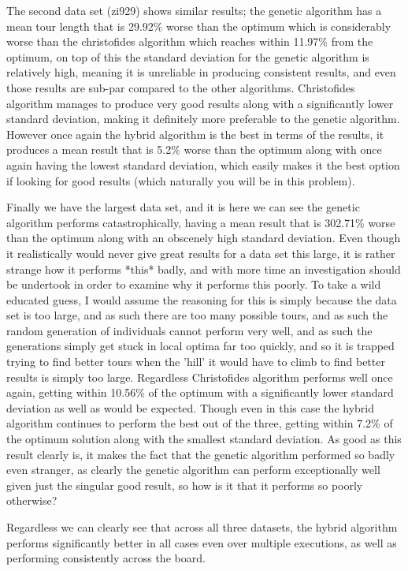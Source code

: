 \documentclass[11pt,a4paper,titlepage]{article}
\begin{document}
The second data set (zi929) shows similar results; the genetic algorithm has a mean tour length that is 29.92\% worse than the optimum which is considerably worse than the christofides algorithm which reaches within 11.97\% from the optimum, on top of this the standard deviation for the genetic algorithm is relatively high, meaning it is unreliable in producing consistent results, and even those results are sub-par compared to the other algorithms. Christofides algorithm manages to produce very good results along with a significantly lower standard deviation, making it definitely more preferable to the genetic algorithm. However once again the hybrid algorithm is the best in terms of the results, it produces a mean result that is 5.2\% worse than the optimum along with once again having the lowest standard deviation, which easily makes it the best option if looking for good results (which naturally you will be in this problem).

Finally we have the largest data set, and it is here we can see the genetic algorithm performs catastrophically, having a mean result that is 302.71\% worse than the optimum along with an obscenely high standard deviation. Even though it realistically would never give great results for a data set this large, it is rather strange how it performs *this* badly, and with more time an investigation should be undertook in order to examine why it performs this poorly. To take a wild educated guess, I would assume the reasoning for this is simply because the data set is too large, and as such there are too many possible tours, and as such the random generation of individuals cannot perform very well, and as such the generations simply get stuck in local optima far too quickly, and so it is trapped trying to find better tours when the 'hill' it would have to climb to find better results is simply too large. Regardless Christofides algorithm performs well once again, getting within 10.56\% of the optimum with a significantly lower standard deviation as well as would be expected. Though even in this case the hybrid algorithm continues to perform the best out of the three, getting within 7.2\% of the optimum solution along with the smallest standard deviation. As good as this result clearly is, it makes the fact that the genetic algorithm performed so badly even stranger, as clearly the genetic algorithm can perform exceptionally well given just the singular good result, so how is it that it performs so poorly otherwise?

Regardless we can clearly see that across all three datasets, the hybrid algorithm performs significantly better in all cases even over multiple executions, as well as performing consistently across the board.
\end{document}
